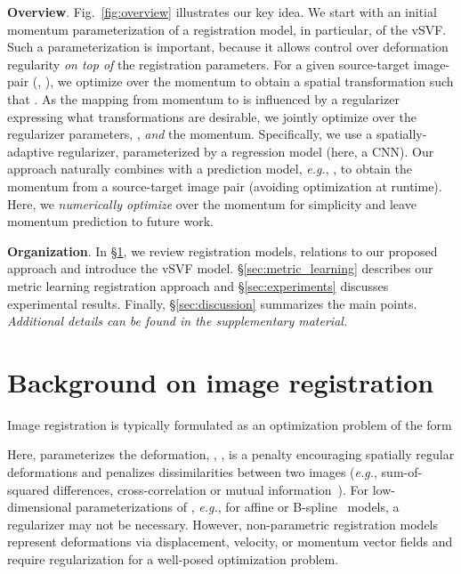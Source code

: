 \documentclass[10pt,twocolumn,letterpaper,table]{article}
\numberwithin{equation}{section}
\theoremstyle{plain}
\theoremstyle{definition}
\def\eg{\emph{e.g.}}  \def\Eg{\emph{E.g.}}
\begin{document}
\noindent
\textbf{Overview}.
Fig.~\ref{fig:overview} illustrates our key idea. We start with an initial momentum parameterization of a registration model, in particular, of the vSVF. Such a parameterization is important, because it allows control over deformation regularity \emph{on top of} the registration parameters. For a given source-target image-pair (, ), we optimize over the momentum to obtain a spatial transformation  such that . As the mapping from momentum to  is influenced by a regularizer expressing what transformations are desirable, we jointly optimize over the regularizer parameters, , \emph{and} the momentum. Specifically, we use a spatially-adaptive regularizer, parameterized by a regression model (here, a CNN). Our approach naturally combines with a prediction model, \eg, \cite{yang2017quicksilver}, to obtain the momentum from a source-target image pair (avoiding optimization at runtime). Here, we \emph{numerically optimize} over the momentum for simplicity and leave momentum prediction to future work.

\noindent
\textbf{Organization}. In \S\ref{sec:background}, we review registration models, relations to our proposed approach and introduce the vSVF model. \S\ref{sec:metric_learning} describes our metric learning registration approach and \S\ref{sec:experiments} discusses experimental results. 
Finally, \S\ref{sec:discussion} summarizes the main points. \emph{Additional details can be found in the supplementary material.} 

\vspace{-0.25cm}

\section{Background on image registration}
\label{sec:background}

Image registration is typically formulated as an optimization problem of the form

Here,  parameterizes the deformation, , ,  is a penalty encouraging spatially regular deformations and  penalizes dissimilarities between two images (\eg, sum-of-squared differences, cross-correlation or mutual information~\cite{hermosillo2002variational}). For low-dimensional parameterizations of , \eg, for affine or B-spline~\cite{rueckert1999nonrigid,modat2010fast} models, a regularizer may not be necessary. However, non-parametric registration models~\cite{modersitzki2004numerical} represent deformations via displacement, velocity, or momentum vector fields and require regularization for a well-posed optimization problem.
\end{document}
